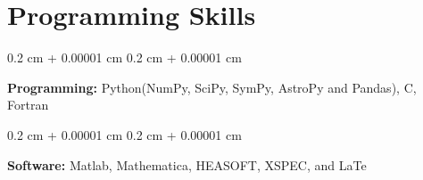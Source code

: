 \documentclass[10pt, letterpaper]{article}
\newenvironment{onecolentry}{
    \begin{adjustwidth}{
        0.2 cm + 0.00001 cm
    }{
        0.2 cm + 0.00001 cm
    }
}{
    \end{adjustwidth}
}
\begin{document}
\section{Programming Skills}

    \begin{onecolentry}
        \textbf{Programming:} Python(NumPy, SciPy, SymPy, AstroPy and Pandas), C, Fortran
    \end{onecolentry}

    \vspace{0.2 cm}

    \begin{onecolentry}
        \textbf{Software:} Matlab, Mathematica, HEASOFT, XSPEC, and LaTe
    \end{onecolentry}


    
\end{document}
